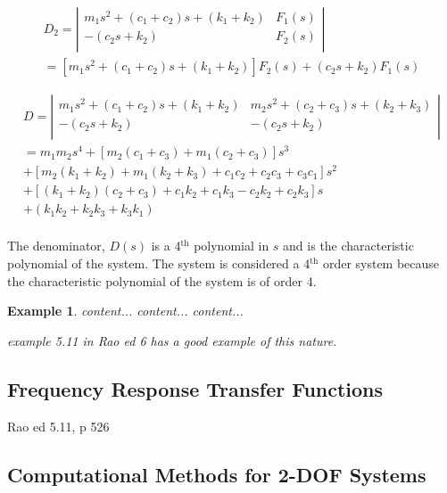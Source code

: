 \documentclass[12pt,letter]{article}
\newtheorem{ex}{Example}
\numberwithin{ex}{section} %
\newenvironment{example}{\begin{mdframed}[middlelinewidth=0.5mm]\begin{ex}\normalfont}{\end{ex}\end{mdframed}}
\numberwithin{re}{section} %
\newcommand{\rd}[1]{\textcolor[rgb]{0.75,0.00,0.00}{#1}}
\begin{document}
\begin{eqnarray}
D_2 = \left|
\begin{array}{cc}
m_1 s^2 + (c_1 + c_2)s + (k_1+k_2)  & F_1(s) \\
-(c_2s+k_2)  & F_2(s) \\
\end{array}
\right| \\
= [m_1 s^2 + (c_1 + c_2)s + (k_1+k_2)]F_2(s) + (c_2s+k_2)F_1(s)  \nonumber
\end{eqnarray}

\begin{eqnarray}
D = \left|
\begin{array}{cc}
m_1 s^2 + (c_1 + c_2)s + (k_1+k_2) & m_2 s^2 + (c_2 + c_3)s + (k_2+k_3) \\
-(c_2s+k_2) & -(c_2s+k_2) \\
\end{array}
\right| \\ \nonumber
= m_1m_2s^4 + [m_2(c_1+c_3)+m_1(c_2+c_3)]s^3 \\  \nonumber
+ [m_2(k_1+k_2)+m_1(k_2+k_3)+c_1c_2+c_2c_3+c_3c_1]s^2 \\  \nonumber
+ [(k_1+k_2)(c_2+c_3)+c_1k_2+c_1k_3-c_2k_2+c_2k_3]s \\  \nonumber
+ (k_1k_2 + k_2k_3 + k_3k_1) \\  \nonumber
\end{eqnarray}

The denominator, $D(s)$ is a 4$^{\text{th}}$ polynomial in $s$ and is the characteristic polynomial of the system. The system is considered a 4$^{\text{th}}$ order system because the characteristic polynomial of the system is of order 4. 

\begin{example}
content...
content...
content...

\rd{example 5.11 in Rao ed 6 has a good example of this nature.}
\end{example}

\subsection{Frequency Response Transfer Functions}

\rd{Rao ed 5.11, p 526}


\subsection{Computational Methods for 2-DOF Systems}
\end{document}
